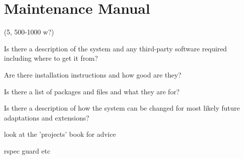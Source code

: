 \clearpage
\section{Maintenance Manual}
\label{sec:maintenance_manual}


(5, 500-1000 w?)

Is there a description of the system and any third-party software required
including where to get it from?

Are there installation instructions and how good are they?

Is there a list of packages and files and what they are for?

Is there a description of how the system can be changed for most likely future
adaptations and extensions?

look at the 'projects' book for advice




 rspec guard etc

\label{sec:maintenance_manual:customising_output}
